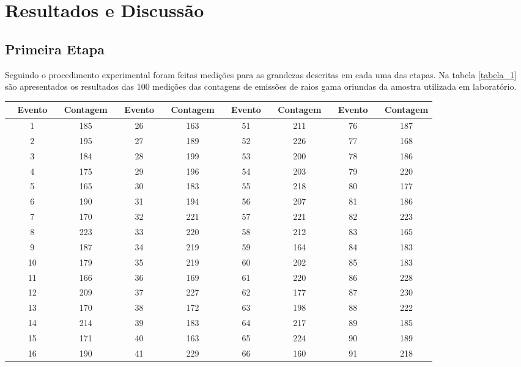 \documentclass{article}
\begin{document}
\section{Resultados e Discussão}

\subsection{Primeira Etapa}

Seguindo o procedimento experimental foram feitas medições para as grandezas descritas em cada uma das etapas. Na tabela \ref{tabela_1}  são apresentados os resultados das 100 medições das contagens de emissões de raios gama oriundas da amostra utilizada em laboratório. 

\begin{table}[ht]
    \centering
    \begin{tabular}{|c|c|c|c|c|c|c|c|}
    \hline
    \rowcolor{cinzaclaro}
~ \textbf{Evento} ~ & \textbf{Contagem}& ~ \textbf{Evento} ~ & \textbf{Contagem} & ~ \textbf{Evento} ~ & \textbf{Contagem} & ~ \textbf{Evento} ~ & \textbf{Contagem} \\ \hline
1 & 185 & 26 & 163 & 51 & 211 & 76 & 187 \\ \hline
2 & 195 & 27 & 189 & 52 & 226 & 77 & 168 \\ \hline
3 & 184 & 28 & 199 & 53 & 200 & 78 & 186 \\ \hline
4 & 175 & 29 & 196 & 54 & 203 & 79 & 220 \\ \hline
5 & 165 & 30 & 183 & 55 & 218 & 80 & 177 \\ \hline
6 & 190 & 31 & 194 & 56 & 207 & 81 & 186 \\ \hline
7 & 170 & 32 & 221 & 57 & 221 & 82 & 223 \\ \hline
8 & 223 & 33 & 220 & 58 & 212 & 83 & 165 \\ \hline
9 & 187 & 34 & 219 & 59 & 164 & 84 & 183 \\ \hline
10 & 179 & 35 & 219 & 60 & 202 & 85 & 183 \\ \hline
11 & 166 & 36 & 169 & 61 & 220 & 86 & 228 \\ \hline
12 & 209 & 37 & 227 & 62 & 177 & 87 & 230 \\ \hline
13 & 170 & 38 & 172 & 63 & 198 & 88 & 222 \\ \hline
14 & 214 & 39 & 183 & 64 & 217 & 89 & 185 \\ \hline
15 & 171 & 40 & 163 & 65 & 224 & 90 & 189 \\ \hline
16 & 190 & 41 & 229 & 66 & 160 & 91 & 218 \\ \hline

\end{tabular}
\end{table}
\end{document}

